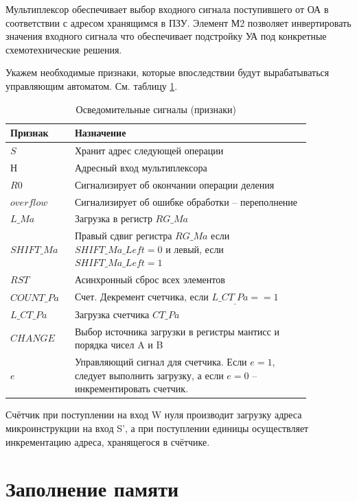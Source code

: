\documentclass[a4paper,14pt]{extarticle}
\begin{document}
Мультиплексор обеспечивает выбор входного сигнала поступившего от ОА в соответствии с адресом хранящимся в ПЗУ.
Элемент М2 позволяет инвертировать значения входного сигнала что обеспечивает подстройку УА под конкретные схемотехнические решения.






Укажем необходимые признаки, которые впоследствии будут вырабатываться управляющим автоматом. См. таблицу \ref{tab:signals5}.
\begin{table}[h!]
	\centering
	\small
	\begin{tabular}{|m{0.17\linewidth}|m{0.7\linewidth}|}
		\hline
		\textbf{Признак} & \textbf{Назначение} \\ \hline
		$S$ & Хранит адрес следующей операции \\ \hline
		$Н$ & Адресный вход мультиплексора \\ \hline
		$R0$ & Сигнализирует об окончании операции деления \\ \hline
		$overflow$ & Сигнализирует об ошибке обработки -- переполнение \\ \hline
		$L\_Ma$ & Загрузка в регистр $RG\_Ma$ \\ \hline
		$SHIFT\_Ma$ & Правый сдвиг регистра $RG\_Ma$ если $SHIFT\_Ma\_Left=0$ и левый, если  $SHIFT\_Ma\_Left=1$ \\ \hline
		$RST$ & Асинхронный сброс всех элементов \\ \hline
		$COUNT\_Pa$ & Счет. Декремент счетчика, если $L\_CT_\_Pa==1$ \\ \hline
		$L\_CT\_Pa$ & Загрузка счетчика $CT\_Pa$ \\ \hline
		$CHANGE$ & Выбор источника загрузки в регистры мантисс и порядка чисел A и B \\ \hline
		$e$ & Управляющий сигнал для счетчика. Если $e=1$, следует выполнить загрузку, а если $e=0$ -- инкрементировать счетчик. \\ \hline
	\end{tabular}
	\caption{Осведомительные сигналы (признаки)}
	\label{tab:signals5}
\end{table}

\fi

Счётчик при поступлении на вход W нуля производит загрузку адреса микроинструкции на вход S', а при поступлении единицы осуществляет инкрементацию адреса, хранящегося в счётчике.

\section{Заполнение памяти}
\end{document}
